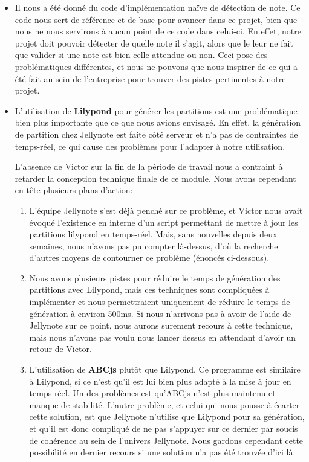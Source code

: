\documentclass[12pt]{article}
\begin{document}
\begin{itemize}
\item Il nous a été donné du code d'implémentation naïve de détection de note. Ce code nous sert de référence et de base pour avancer dans ce projet, bien que nous ne nous servirons à aucun point de ce code dans celui-ci. En effet, notre projet doit pouvoir détecter de quelle note il s'agit, alors que le leur ne fait que valider si une note est bien celle attendue ou non. Ceci pose des problématiques différentes, et nous ne pouvons que nous inspirer de ce qui a été fait au sein de l'entreprise pour trouver des pistes pertinentes à notre projet.\\
\item L'utilisation de \textbf{Lilypond} pour générer les partitions est une problématique bien plus importante que ce que nous avions envisagé. En effet, la génération de partition chez Jellynote est faite côté serveur et n'a pas de contraintes de temps-réel, ce qui cause des problèmes pour l'adapter à notre utilisation. \\
\par L'absence de Victor sur la fin de la période de travail nous a contraint à retarder la conception technique finale de ce module. Nous avons cependant en tête plusieurs plans d'action:
\begin{enumerate}

\item L'équipe Jellynote s'est déjà penché sur ce problème, et Victor nous avait évoqué l'existence en interne d'un script permettant de mettre à jour les partitions lilypond en temps-réel. Mais, sans nouvelles depuis deux semaines, nous n'avons pas pu compter là-dessus, d'où la recherche d'autres moyens de contourner ce problème (énoncés ci-dessous).

\item Nous avons plusieurs pistes pour réduire le temps de génération des partitions avec Lilypond, mais ces techniques sont compliquées à implémenter et nous permettraient uniquement de réduire le temps de génération à environ 500ms. Si nous n'arrivons pas à avoir de l'aide de Jellynote sur ce point, nous aurons surement recours à cette technique, mais nous n'avons pas voulu nous lancer dessus en attendant d'avoir un retour de Victor.

\item L'utilisation de \textbf{ABCjs} plutôt que Lilypond. Ce programme est similaire à Lilypond, si ce n'est qu'il est lui bien plus adapté à la mise à jour en temps réel. Un des problèmes est qu'ABCjs n'est plus maintenu et manque de stabilité. L'autre problème, et celui qui nous pousse à écarter cette solution, est que Jellynote n'utilise que Lilypond pour sa génération, et qu'il est donc compliqué de ne pas s'appuyer sur ce dernier par soucis de cohérence au sein de l'univers Jellynote. Nous gardons cependant cette possibilité en dernier recours si une solution n'a pas été trouvée d'ici là. \\



\end{enumerate}
\end{itemize}
\end{document}
